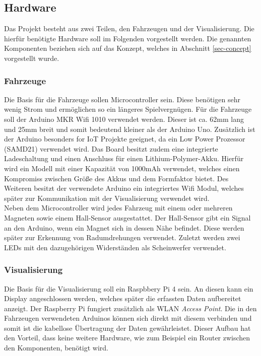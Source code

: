 \documentclass[.../Dokumentation.tex]{subfiles}
\begin{document}
\subsection{Hardware}\label{sec-components-hardware}
Das Projekt besteht aus zwei Teilen, den Fahrzeugen und der Visualisierung.
Die hierfür benötigte Hardware soll im Folgenden vorgestellt werden.
Die genannten Komponenten beziehen sich auf das Konzept, welches in Abschnitt 
\ref{sec-concept} vorgestellt wurde.
\subsubsection{Fahrzeuge}
Die Basis für die Fahrzeuge sollen Microcontroller sein. Diese benötigen sehr 
wenig Strom und ermöglichen so ein längeres Spielvergnügen. 
Für die Fahrzeuge soll der Arduino MKR Wifi 1010 verwendet werden. Dieser ist 
ca. 62mm lang und 25mm breit und somit bedeutend kleiner als der Arduino Uno. 
Zusätzlich ist der Arduino besonders for IoT Projekte geeignet, da ein Low 
Power Prozessor (SAMD21) verwendet wird. Das Board besitzt zudem eine 
integrierte Ladeschaltung und einen Anschluss für einen Lithium-Polymer-Akku. 
Hierfür wird ein Modell mit einer Kapazität von 1000mAh verwendet, welches 
einen Kompromiss zwischen Größe des Akkus und dem Formfaktor bietet. Des 
Weiteren besitzt der verwendete Arduino ein integriertes Wifi Modul, welches 
später zur Kommunikation mit der Visualisierung verwendet wird. \\
Neben dem Microcontroller wird jedes Fahrzeug mit einem oder mehreren Magneten sowie einem 
Hall-Sensor ausgestattet. Der Hall-Sensor gibt ein Signal an den Arduino, 
wenn ein Magnet sich in dessen Nähe befindet. Diese werden später zur Erkennung 
von Radumdrehungen verwendet. Zuletzt werden zwei LEDs mit den dazugehörigen 
Widerständen als Scheinwerfer verwendet.

\subsubsection{Visualisierung}
Die Basis für die Visualisierung soll ein Raspbbery Pi 4 sein. An diesen kann 
ein Display angeschlossen werden, welches später die erfassten Daten 
aufbereitet anzeigt. Der Raspberry Pi fungiert zusätzlich als WLAN 
\textit{Access Point}. Die in den Fahrzeugen verwendeten Arduinos können sich 
direkt mit diesem verbinden und somit ist die kabellose Übertragung der Daten 
gewährleistet. Dieser Aufbau hat den Vorteil, dass keine weitere 
Hardware, wie zum Beispiel ein Router zwischen den Komponenten, benötigt wird.
\end{document}
